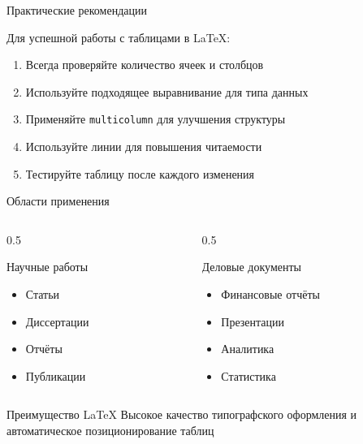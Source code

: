 \documentclass[aspectratio=169]{beamer}
\begin{document}
\begin{frame}{Практические рекомендации}
    \begin{block}{Для успешной работы с таблицами в LaTeX:}
        \begin{enumerate}
            \item Всегда проверяйте количество ячеек и столбцов
            \item Используйте подходящее выравнивание для типа данных
            \item Применяйте \texttt{multicolumn} для улучшения структуры
            \item Используйте линии для повышения читаемости
            \item Тестируйте таблицу после каждого изменения
        \end{enumerate}
    \end{block}
\end{frame}

\begin{frame}{Области применения}
    \begin{columns}[T]
        \begin{column}{0.5\textwidth}
            \begin{block}{Научные работы}
                \begin{itemize}
                    \item Статьи
                    \item Диссертации
                    \item Отчёты
                    \item Публикации
                \end{itemize}
            \end{block}
        \end{column}
        
        \begin{column}{0.5\textwidth}
            \begin{block}{Деловые документы}
                \begin{itemize}
                    \item Финансовые отчёты
                    \item Презентации
                    \item Аналитика
                    \item Статистика
                \end{itemize}
            \end{block}
        \end{column}
    \end{columns}
    
    \vspace{0.5cm}
    
    \begin{exampleblock}{Преимущество LaTeX}
        Высокое качество типографского оформления и автоматическое позиционирование таблиц
    \end{exampleblock}
\end{frame}
\end{document}
